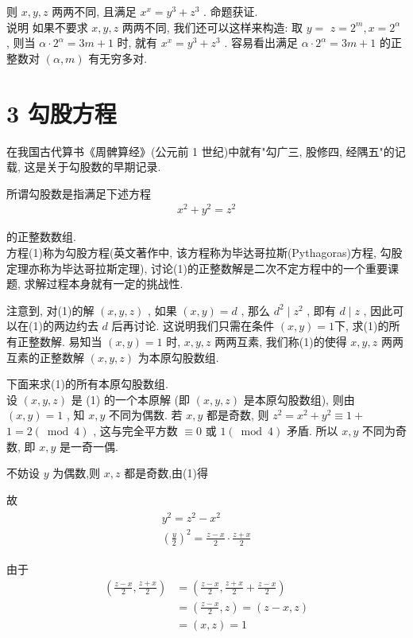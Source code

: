 	则 $x ,  y ,  z$ 两两不同, 且满足 $x^{x}=y^{3}+z^{3}$ . 命题获证. \\
	说明 如果不要求 $x ,  y ,  z$ 两两不同, 我们还可以这样来构造: 取 $y=$ $z=2^{m} ,  x=2^{\alpha}$ , 则当 $\alpha \cdot 2^{\alpha}=3 m+1$ 时, 就有 $x^{x}=y^{3}+z^{3}$ . 容易看出满足 $\alpha \cdot 2^{\alpha}=3 m+1$ 的正整数对 $(\alpha, m)$ 有无穷多对.

	\section{3 勾股方程}
	在我国古代算书《周髀算经》(公元前 1 世纪)中就有"勾广三, 股修四, 经隅五"的记载, 这是关于勾股数的早期记录.

	所谓勾股数是指满足下述方程
\begin{align*}
		x^{2}+y^{2}=z^{2}
	\end{align*}

	的正整数数组.\\
	方程(1)称为勾股方程(英文著作中, 该方程称为毕达哥拉斯(Pythagoras)方程, 勾股定理亦称为毕达哥拉斯定理), 讨论(1)的正整数解是二次不定方程中的一个重要课题, 求解过程本身就有一定的挑战性.

	注意到, 对(1)的解 $(x, y, z)$ , 如果 $(x, y)=d$ , 那么 $d^{2} \mid z^{2}$ , 即有 $d \mid z$ , 因此可以在(1)的两边约去 $d$ 后再讨论. 这说明我们只需在条件 $(x, y)=1$下, 求(1)的所有正整数解. 易知当 $(x, y)=1$ 时,  $x ,  y ,  z$ 两两互素, 我们称(1)的使得 $x ,  y ,  z$ 两两互素的正整数解 $(x, y, z)$ 为本原勾股数组.

	下面来求(1)的所有本原勾股数组. \\
	设 $(x, y, z)$ 是 (1) 的一个本原解 (即 $(x, y, z)$ 是本原勾股数组), 则由\\
$(x, y)=1$ , 知 $x ,  y$ 不同为偶数. 若 $x ,  y$ 都是奇数, 则 $z^{2}=x^{2}+y^{2} \equiv 1+$ $1=2(\bmod 4)$ , 这与完全平方数 $\equiv 0$ 或 $1(\bmod 4)$ 矛盾. 所以 $x ,  y$ 不同为奇数, 即 $x ,  y$ 是一奇一偶.

	不妨设 $y$ 为偶数,则 $x ,  z$ 都是奇数,由(1)得

	故
\begin{align*}
		\begin{gathered}
			y^{2}=z^{2}-x^{2} \\
			\left(\frac{y}{2}\right)^{2}=\frac{z-x}{2} \cdot \frac{z+x}{2}
		\end{gathered}
	\end{align*}

	由于\begin{align}
		\left(\frac{z-x}{2}, \frac{z+x}{2}\right) & =\left(\frac{z-x}{2}, \frac{z+x}{2}+\frac{z-x}{2}\right) \\
		                                          & =\left(\frac{z-x}{2}, z\right)=(z-x, z)                  \\
		                                          & =(x, z)=1
	\end{align}

